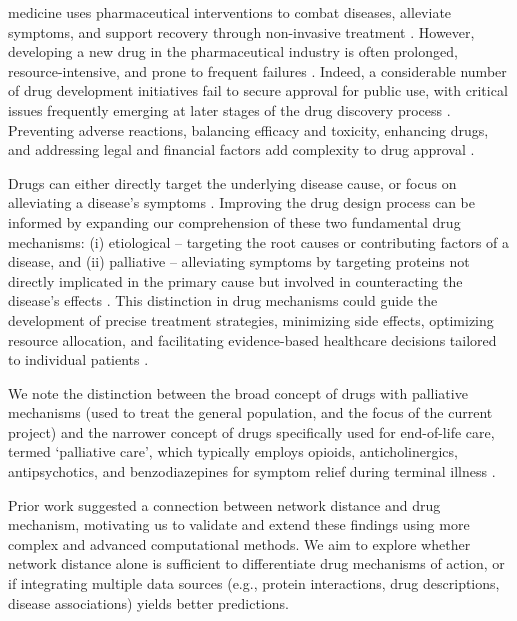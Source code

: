 \documentclass[journal,twoside,web]{ieeecolor}
\begin{document}
 medicine uses pharmaceutical interventions to combat diseases, alleviate symptoms, and support recovery through non-invasive treatment \cite{ravikumar2018improving,yu2020exploring}.
However, developing a new drug in the pharmaceutical industry is often prolonged, resource-intensive, and prone to frequent failures \cite{hammel2019new,xue2018review}.
Indeed, a considerable number of drug development initiatives fail to secure approval for public use, with critical issues frequently emerging at later stages of the drug discovery process \cite{hammel2019new}.
Preventing adverse reactions, balancing efficacy and toxicity, enhancing drugs, and addressing legal and financial factors add complexity to drug approval \cite{ravikumar2018improving}.

Drugs can either directly target the underlying disease cause, or focus on alleviating a disease's symptoms \cite{yildirim2007drug,lindpaintner2002impact}.
Improving the drug design process can be informed by expanding our comprehension of these two fundamental drug mechanisms: 
(i) etiological -- targeting the root causes or contributing factors of a disease, and 
(ii) palliative -- alleviating symptoms by targeting proteins not directly implicated in the primary cause but involved in counteracting the disease's effects \cite{yildirim2007drug,lindpaintner2002impact}.
This distinction in drug mechanisms could guide the development of precise treatment strategies, minimizing side effects, optimizing resource allocation, and facilitating evidence-based healthcare decisions tailored to individual patients \cite{vogt2014molecularly}.

We note the distinction between the broad concept of drugs with palliative mechanisms (used to treat the general population, and the focus of the current project) and the narrower concept of drugs specifically used for end-of-life care, termed `palliative care', which typically employs opioids, anticholinergics, antipsychotics, and benzodiazepines for symptom relief during terminal illness \cite{jansen2018safety}.

Prior work \cite{yildirim2007drug,lindpaintner2002impact} suggested a connection between network distance and drug mechanism, motivating us to validate and extend these findings using more complex and advanced computational methods. 
We aim to explore whether network distance alone is sufficient to differentiate drug mechanisms of action, or if integrating multiple data sources (e.g., protein interactions, drug descriptions, disease associations) yields better predictions.
\end{document}
